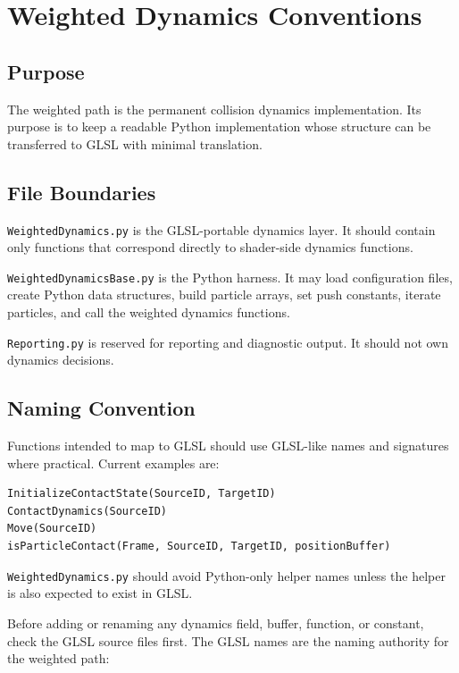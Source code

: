 
\section{Weighted Dynamics Conventions}

\subsection{Purpose}

The weighted path is the permanent collision dynamics implementation.  Its
purpose is to keep a readable Python implementation whose structure can be
transferred to GLSL with minimal translation.

\subsection{File Boundaries}

\texttt{WeightedDynamics.py} is the GLSL-portable dynamics layer.  It should contain
only functions that correspond directly to shader-side dynamics functions.

\texttt{WeightedDynamicsBase.py} is the Python harness.  It may load configuration files,
create Python data structures, build particle arrays, set push constants,
iterate particles, and call the weighted dynamics functions.

\texttt{Reporting.py} is reserved for reporting and diagnostic output.  It
should not own dynamics decisions.

\subsection{Naming Convention}

Functions intended to map to GLSL should use GLSL-like names and signatures
where practical.  Current examples are:

\begin{verbatim}
InitializeContactState(SourceID, TargetID)
ContactDynamics(SourceID)
Move(SourceID)
isParticleContact(Frame, SourceID, TargetID, positionBuffer)
\end{verbatim}

\texttt{WeightedDynamics.py} should avoid Python-only helper names unless the helper
is also expected to exist in GLSL.

Before adding or renaming any dynamics field, buffer, function, or constant, check
the GLSL source files first.  The GLSL names are the naming authority for the
weighted path:

